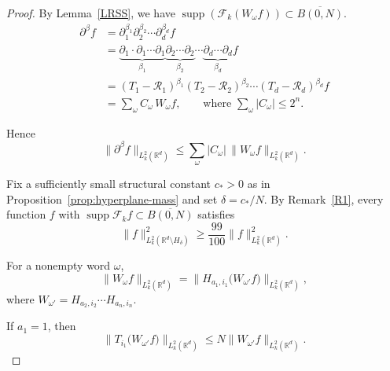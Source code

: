 \documentclass[12pt]{article}
\DeclareMathOperator{\supp}{supp}
\begin{document}
\begin{proof}
By Lemma~\ref{LRSS}, we have $\supp(\mathcal{F}_k(W_\omega f))\subset \overline{B(0,N)}$.
\begin{align*}
\partial^{\beta} f
&= \partial_1^{\beta_1}\partial_2^{\beta_2}\cdots\partial_d^{\beta_d} f \\
&= \underbrace{\partial_1\cdot \partial_1\cdots \partial_1}_{\beta_1}
\underbrace{\partial_2\cdots \partial_2}_{\beta_2}
\cdots
\underbrace{\partial_d\cdots \partial_d}_{\beta_d} f \\
&= (T_1-\mathcal{R}_1)^{\beta_1}(T_2-\mathcal{R}_2)^{\beta_2}\cdots (T_d-\mathcal{R}_d)^{\beta_d} f \\
&= \sum_{\omega} C_{\omega}\, W_\omega f,
\qquad \text{where } \sum_{\omega} |C_{\omega}|\leq 2^n.
\end{align*}

Hence
\begin{equation}\label{EBSS2}
\|\partial^\beta f\|_{L_k^2(\mathbb{R}^d)}\leq \sum_{\omega}|C_{\omega}|\,\|W_\omega f\|_{L_k^2(\mathbb{R}^d)}.
\end{equation}

Fix a sufficiently small structural constant $c_*>0$ as in Proposition~\ref{prop:hyperplane-mass} and set $\delta=c_*/N$. By Remark~\ref{R1}, every function $f$ with $\supp\mathcal{F}_k f\subset\overline{B(0,N)}$ satisfies
\[
\|f\|_{L_k^2(\mathbb{R}^d\setminus H_\delta)}^2 \ge \frac{99}{100}\|f\|_{L_k^2(\mathbb{R}^d)}^2.
\]

For a nonempty word $\omega$,
\[
\|W_\omega f\|_{L_k^2(\mathbb{R}^d)} = \|H_{a_1 ,i_1}\big(W_{\omega'} f\big)\|_{L_k^2(\mathbb{R}^d)},
\]
where $W_{\omega'} =H_{a_2,i_2}\cdots H_{a_n,i_n}$.

If $a_1=1$, then
\[
\|T_{i_1}\big(W_{\omega'} f\big)\|_{L_k^2(\mathbb{R}^d)} \le N \|W_{\omega'} f\|_{L_k^2(\mathbb{R}^d)}.
\]


\end{proof}
\end{document}

